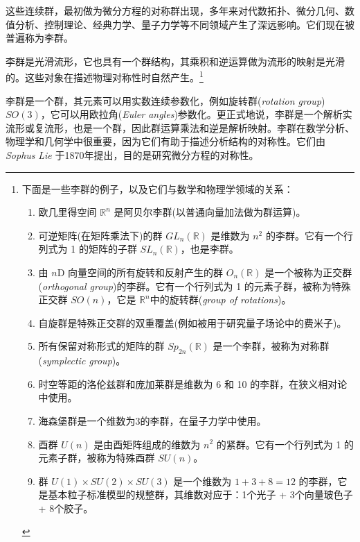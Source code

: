 \documentclass[11pt,fontset=founder]{ctexart}
\begin{document}
这些连续群，最初做为微分方程的对称群出现，多年来对代数拓扑、微分几何、数值分析、控制理论、经典力学、量子力学等不同领域产生了深远影响。它们现在被普遍称为李群。

李群是光滑流形，它也具有一个群结构，其乘积和逆运算做为流形的映射是光滑的。这些对象在描述物理对称性时自然产生。\footnote{%
下面是一些李群的例子，以及它们与数学和物理学领域的关系：
\par
\begin{enumerate}
\item 欧几里得空间 $\mathbb{R}^{n}$ 是阿贝尔李群(以普通向量加法做为群运算)。
\par
\item 可逆矩阵(在矩阵乘法下)的群 $GL_{n}(\mathbb{R})$ 是维数为 $n^{2}$ 的李群。它有一个行列式为 1 的矩阵的子群 $SL_{n}(\mathbb{R})$，也是李群。
\par
\item 由 $n$D 向量空间的所有旋转和反射产生的群 $O_{n}(\mathbb{R})$ 是一个被称为正交群(\textit{orthogonal group})的李群。它有一个行列式为 1 的元素子群，被称为特殊正交群 $SO(n)$，它是 $\mathbb{R}^{n}$中的旋转群(\textit{group of rotations})。
\par
\item 自旋群是特殊正交群的双重覆盖(例如被用于研究量子场论中的费米子)。
\par
\item 所有保留对称形式的矩阵的群 $Sp_{2n}(\mathbb{R})$ 是一个李群，被称为对称群(\textit{symplectic group})。
\par
\item 时空等距的洛伦兹群和庞加莱群是维数为 6 和 10 的李群，在狭义相对论中使用。
\par
\item 海森堡群是一个维数为3的李群，在量子力学中使用。
\par
\item 酉群 $U(n)$ 是由酉矩阵组成的维数为 $n^{2}$ 的紧群。它有一个行列式为 1 的元素子群，被称为特殊酉群 $SU(n)$。
\par
\item 群 $U(1)\times SU(2)\times SU(3)$ 是一个维数为 $1+3+8=12$ 的李群，它是基本粒子标准模型的规整群，其维数对应于：1个光子 + 3个向量玻色子 + 8个胶子。
\end{enumerate}
}

李群是一个群，其元素可以用实数连续参数化，例如旋转群(\textit{rotation group}) $SO(3)$，它可以用欧拉角(\textit{Euler angles})参数化。更正式地说，李群是一个解析实流形或复流形，也是一个群，因此群运算乘法和逆是解析映射。李群在数学分析、物理学和几何学中很重要，因为它们有助于描述分析结构的对称性。它们由 \emph{Sophus} \textit{Lie} 于1870年提出，目的是研究微分方程的对称性。
\end{document}
